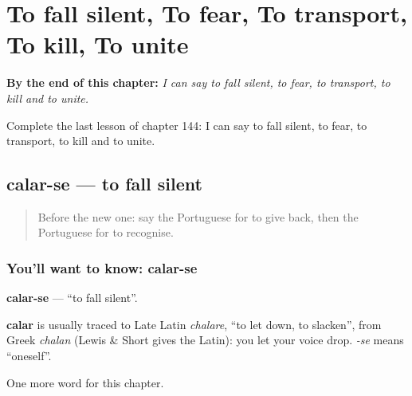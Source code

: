 
\chapter{To fall silent, To fear, To transport, To kill, To unite}
\label{ch:pt-to-fall-silent-to-fear-to-transport-to-kill-to-unite}

\begin{chapteropening}
\textbf{By the end of this chapter:} \emph{I can say to fall silent, to fear, to transport, to kill and to unite.}

Complete the last lesson of chapter 144: I can say to fall silent, to fear, to transport, to kill and to unite.
\end{chapteropening}

\section[calar-se]{calar-se — to fall silent}

\label{lesson:PT-C144-calar-se}



\begin{quote}
Before the new one: say the Portuguese for to give back, then the Portuguese for to recognise.
\end{quote}

\subsection*{You'll want to know: calar-se}
\textbf{calar-se} — \textquotedblleft{}to fall silent\textquotedblright{}.

\begin{cousinweb}
\textbf{calar} is usually traced to Late Latin \emph{chalare}, \textquotedblleft{}to let down, to slacken\textquotedblright{}, from Greek \emph{chalan} (Lewis \& Short gives the Latin): you let your voice drop. \emph{-se} means \textquotedblleft{}oneself\textquotedblright{}.
\end{cousinweb}

\begin{grammarlens}[title={What you've built}]
One more word for this chapter.
\end{grammarlens}

